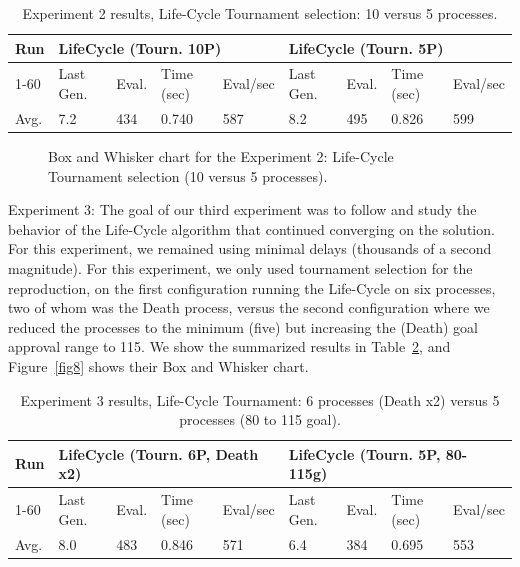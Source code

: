 \documentclass[runningheads]{llncs}
\begin{document}
\begin{table}[]
    \centering        
    \caption{Experiment 2 results, Life-Cycle Tournament selection: 10 versus 5 processes.}\label{tab3}
    \begin{tabular}{|l|l|l|l|l|l|l|l|l|}
    \hline
    Run & \multicolumn{4}{l|}{LifeCycle (Tourn. 10P)} & \multicolumn{4}{l|}{LifeCycle (Tourn. 5P)} \\ \hline
    1-60 & Last Gen. & Eval. & Time (sec) & Eval/sec & Last Gen. & Eval. & Time (sec) & Eval/sec \\ \hline
    Avg. & 7.2 & 434 & 0.740 & 587 & 8.2 & 495 & 0.826 & 599 \\ \hline
    \end{tabular}
    \end{table}

\begin{figure}
    \caption{Box and Whisker chart for the Experiment 2: Life-Cycle Tournament selection (10 versus 5 processes).} \label{fig7}
    \end{figure}


Experiment 3: The goal of our third experiment was to follow and study the
behavior of the Life-Cycle algorithm that continued converging on the solution.
For this experiment, we remained using minimal delays (thousands of a second
magnitude). For this experiment, we only used tournament selection for the
reproduction, on the first configuration running the Life-Cycle on six
processes, two of whom was the Death process, versus the second configuration
where we reduced the processes to the minimum (five) but increasing the (Death)
goal approval range to 115. We show the summarized results in Table~\ref{tab4},
and Figure~\ref{fig8} shows their Box and Whisker chart.

\begin{table}[]
    \centering        
    \caption{Experiment 3 results, Life-Cycle Tournament: 6 processes (Death x2) versus 5 processes (80 to 115 goal).}\label{tab4}
    \begin{tabular}{|l|l|l|l|l|l|l|l|l|}
    \hline
    Run & \multicolumn{4}{l|}{LifeCycle (Tourn. 6P, Death x2)} & \multicolumn{4}{l|}{LifeCycle (Tourn. 5P, 80-115g)} \\ \hline
    1-60 & Last Gen. & Eval. & Time (sec) & Eval/sec & Last Gen. & Eval. & Time (sec) & Eval/sec \\ \hline
    Avg. & 8.0 & 483 & 0.846 & 571 & 6.4 & 384 & 0.695 & 553 \\ \hline
    \end{tabular}
    \end{table}
\end{document}
